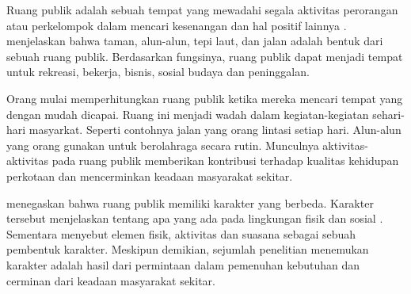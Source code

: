 \documentclass[12pt]{simart} %
\begin{document}
Ruang publik adalah sebuah tempat yang mewadahi segala aktivitas perorangan atau perkelompok dalam mencari kesenangan dan hal positif lainnya \citep{sadat2012}.
\cite{sadat2012} menjelaskan bahwa taman, alun-alun, tepi laut, dan jalan adalah bentuk dari sebuah ruang publik. Berdasarkan fungsinya, ruang publik dapat menjadi tempat untuk rekreasi, bekerja, bisnis, sosial budaya dan peninggalan.


Orang mulai memperhitungkan ruang publik ketika mereka mencari tempat yang dengan mudah dicapai. Ruang ini menjadi wadah dalam kegiatan-kegiatan sehari-hari masyarkat. Seperti contohnya jalan yang orang lintasi setiap hari. Alun-alun yang orang gunakan untuk berolahraga secara rutin. Munculnya aktivitas-aktivitas pada ruang publik memberikan kontribusi terhadap kualitas kehidupan perkotaan dan mencerminkan keadaan masyarakat sekitar.


\cite{ahmadi2009} menegaskan bahwa ruang publik memiliki karakter yang berbeda. Karakter tersebut menjelaskan tentang apa yang ada pada lingkungan fisik dan sosial \citep{dougherty2006}. Sementara \cite{hartanti2014} menyebut elemen fisik, aktivitas dan suasana sebagai sebuah pembentuk karakter. Meskipun demikian, sejumlah penelitian menemukan karakter adalah hasil dari permintaan dalam pemenuhan kebutuhan dan cerminan dari keadaan masyarakat sekitar.

\end{document}
